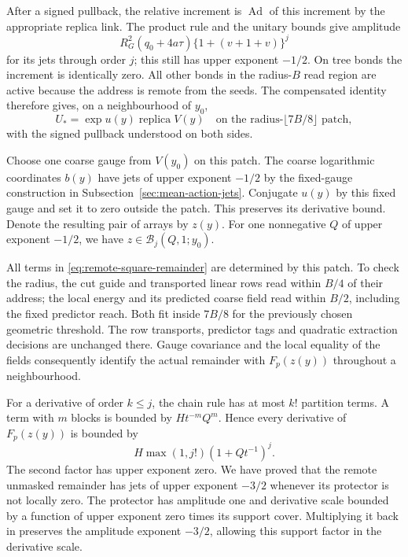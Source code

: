 After a signed pullback, the relative increment is
$\operatorname{Ad}$ of this increment by the appropriate replica
link. The product rule and the unitary bounds give amplitude
\[
 R_G^2(q_0+4a\tau)\{1+(v+1+v)\}^{j}
\]
for its jets through order $j$; this still has upper exponent
$-1/2$. On tree bonds the increment is identically zero. All other
bonds in the radius-$B$ read region are active because the address
is remote from the seeds. The compensated identity therefore gives,
on a neighbourhood of $y_0$,
\[
 U_* =\exp u(y)\operatorname{replica}V(y)
 \quad\text{on the radius-}\lfloor7B/8\rfloor\text{ patch},
\]
with the signed pullback understood on both sides.

Choose one coarse gauge from $V(y_0)$ on this patch. The coarse
logarithmic coordinates $b(y)$ have jets of upper exponent $-1/2$
by the fixed-gauge construction in Subsection~\ref{sec:mean-action-jets}.
Conjugate $u(y)$ by this fixed gauge and set it to zero outside
the patch. This preserves its derivative bound. Denote the resulting
pair of arrays by $z(y)$. For one nonnegative $Q$ of upper exponent
$-1/2$, we have $z\in\mathcal B_j(Q,1;y_0)$.

All terms in \eqref{eq:remote-square-remainder} are determined by
this patch. To check the radius, the cut guide and transported
linear rows read within $B/4$ of their address; the local energy
and its predicted coarse field read within $B/2$, including the
fixed predictor reach. Both fit inside $7B/8$ for the previously
chosen geometric threshold. The row transports, predictor tags and
quadratic extraction decisions are unchanged there. Gauge covariance
and the local equality of the fields consequently identify the
actual remainder with $F_p(z(y))$ throughout a neighbourhood.

For a derivative of order $k\le j$, the chain rule has at most
$k!$ partition terms. A term with $m$ blocks is bounded by
$H t^{-m}Q^m$. Hence every derivative of $F_p(z(y))$ is bounded
by
\[
 H\max(1,j!) (1+Qt^{-1})^j.
\]
The second factor has upper exponent zero. We have proved that
the remote unmasked remainder has jets of upper exponent $-3/2$
whenever its protector is not locally zero. The protector has
amplitude one and derivative scale bounded by a function of upper
exponent zero times its support cover. Multiplying it back in
preserves the amplitude exponent $-3/2$, allowing this support
factor in the derivative scale.

